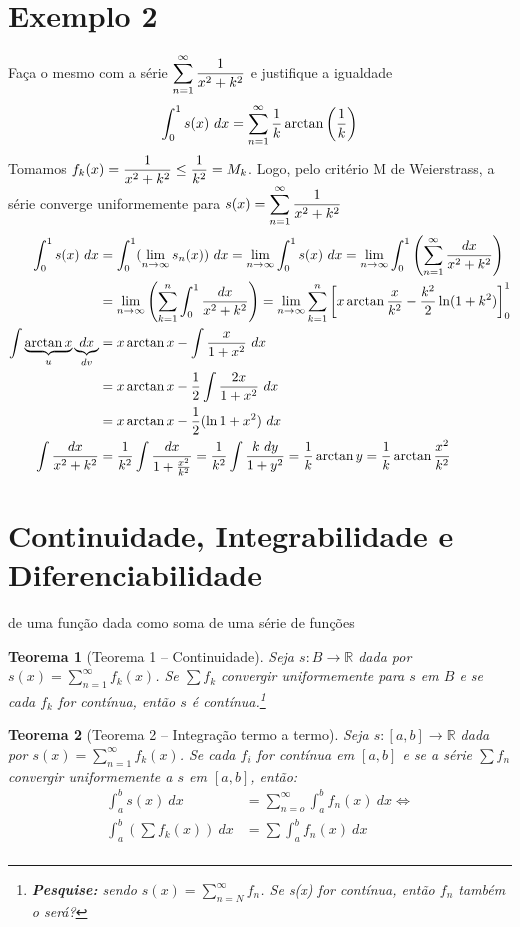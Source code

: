 \documentclass[12pt,openany, letterpaper]{book}
\newtheorem{theorem}{Teorema}[section]
\newcommand{\LI}[1][n]{\lim_{{#1} \rightarrow \infty}}
\newcommand{\soma}[2][n]{\sum_{{#1} = #2}^\infty}
\newcommand{\defini}[3][\mathds{R}]{#2: #3 \rightarrow {#1}}
\begin{document}
\section*{Exemplo 2}{Faça o mesmo com a série $\displaystyle{\soma{1} {1 \over x^2 + k^2}}$ e justifique a igualdade $$\int_0^1 s(x) \ dx = \soma{1} {1 \over k} \arctan \left( {1 \over k} \right)$$} Tomamos $\displaystyle{f_k(x) = {1 \over x^2 + k^2} \leq {1 \over k^2} = M_k}$. Logo, pelo critério M de Weierstrass, a série converge uniformemente para $s(x) = \displaystyle{\soma{1} {1 \over x^2 + k^2}}$ \begin{align*}
\int_0^1 s(x) \ dx &= \int_0^1 (\LI s_n (x)) \ dx = \LI \int_0^1 s(x) \ dx = \LI \int_0^1 \left(\soma{1} {dx \over x^2 + k^2}\right) \\
&= \LI \left( \sum_{k=1}^n \int_0^1 {dx \over x^2 + k^2}\right) = \LI \sum_{k=1}^n \left[ x \arctan {x \over k^2} - {k^2 \over 2} \ln (1+k^2) \right]_0^1\\
\int \underbrace{\arctan x}_{u} \underbrace{dx}_{dv} &= x \arctan x - \int {x \over 1 + x^2} \ dx \\
&= x \arctan x - {1 \over 2} \int {2x \over 1 + x^2} \ dx \\
&= x \arctan x - {1 \over 2} (\ln{1 + x^2}) \ dx \\
\int {dx \over x^2 + k^2} &= {1 \over k^2} \int \frac{dx}{1 + \frac{x^2}{k^2}} = {1 \over k^2} \int \frac{k \ dy}{1 + y^2} = \frac{1}{k} \arctan{y} = \frac{1}{k} \arctan{\frac{x^2}{k^2}}
\end{align*}

 \section{Continuidade, Integrabilidade e Diferenciabilidade} {de uma função dada como soma de uma série de funções}
 
\begin{theorem}[Teorema 1 -- Continuidade] \label{T1 C4}
 Seja $\defini{s}{B}$ dada por $s(x) = \displaystyle{\soma{1} f_k(x)} $. Se $\sum f_k$ convergir uniformemente para $s$ em $B$ e se cada $f_k$ for contínua, então $s$ é contínua.\footnote{\textbf{Pesquise:} sendo $s(x) = \soma{N} f_n$. Se s(x) for contínua, então $f_n$ também o será?}
 \end{theorem}
 
\begin{theorem}[Teorema 2 -- Integração termo a termo] \label{T2 C4}
Seja $\defini{s}{[a,b]}$ dada por $s(x) = \displaystyle{\soma{1} f_k(x)}$. Se cada $f_i$ for contínua em $[a,b]$ e se a série $\sum f_n$ convergir uniformemente a $s$ em $[a,b]$, então: \begin{align*}
\int_a^b  s(x) \ dx &= \soma{o} \int_a^b  f_n(x) \ dx  \Longleftrightarrow\\
\int_a^b \left( \sum f_k(x)\right) \ dx &= \sum \int_a^b  f_n(x) \ dx \\
\end{align*}

\end{theorem}
\end{document}
